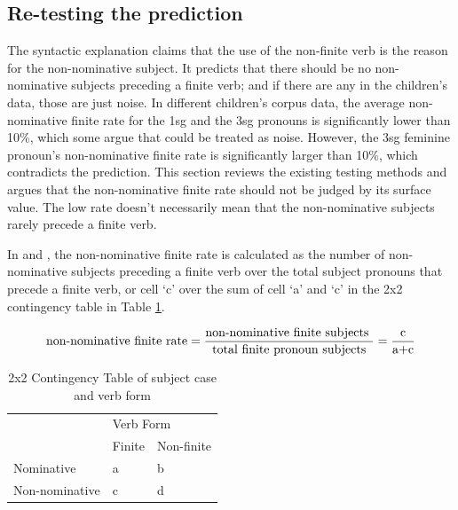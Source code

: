 \subsection{Re-testing the prediction}
The syntactic explanation claims that the use of the non-finite verb is the reason for the non-nominative subject. It predicts that there should be no non-nominative subjects preceding a finite verb; and if there are any in the children's data, those are just noise. In different children's corpus data, the average non-nominative finite rate for the 1sg and the 3sg pronouns is significantly lower than 10\%, which some argue that could be treated as noise. However, the 3sg feminine pronoun's non-nominative finite rate is significantly larger than 10\%, which contradicts the prediction. This section reviews the existing testing methods and argues that the non-nominative finite rate should not be judged by its surface value. The low rate doesn't necessarily mean that the non-nominative subjects rarely precede a finite verb.

In \cite{schutze1996subject} and \cite{pine2005testing}, the non-nominative finite rate is calculated as the number of non-nominative subjects preceding a finite verb over the total subject pronouns that precede a finite verb, or cell `c' over the sum of cell `a' and `c' in the 2x2 contingency table in Table \ref{tab:2x2}. 

\begin{equation}
\label{equ:1}
\centering
     \text{non-nominative finite rate} = \displaystyle\frac{\text{non-nominative finite subjects }}{\text{total finite pronoun subjects}} = \displaystyle\frac{\text{c}}{\text{a+c}}
\end{equation}

\FloatBarrier
\begin{table}[!h]
\centering
\caption{2x2 Contingency Table of subject case and verb form}
\label{tab:2x2}
\begin{tabular}{lll}
\toprule
 & \multicolumn{2}{l}{Verb Form} \\ \cline{2-3} 
 & Finite & Non-finite \\
Nominative & a & b \\
Non-nominative & c & d\\
\bottomrule
\end{tabular}
\end{table}
\FloatBarrier

